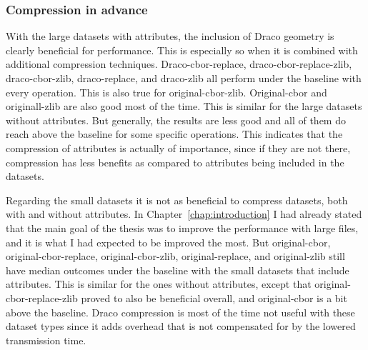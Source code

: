 \subsubsection{Compression in advance}

With the large datasets with attributes, the inclusion of Draco geometry is clearly beneficial for performance.
This is especially so when it is combined with additional compression techniques.
Draco-cbor-replace, draco-cbor-replace-zlib, draco-cbor-zlib, draco-replace, and draco-zlib all perform under the baseline with every operation.
This is also true for original-cbor-zlib. Original-cbor and originall-zlib are also good most of the time.
This is similar for the large datasets without attributes.
But generally, the results are less good and all of them do reach above the baseline for some specific operations.
This indicates that the compression of attributes is actually of importance, since if they are not there, compression has less benefits as compared to attributes being included in the datasets.

Regarding the small datasets it is not as beneficial to compress datasets, both with and without attributes.
In Chapter~\ref{chap:introduction} I had already stated that the main goal of the thesis was to improve the performance with large files, and it is what I had expected to be improved the most.
But original-cbor, original-cbor-replace, original-cbor-zlib, original-replace, and original-zlib still have median outcomes under the baseline with the small datasets that include attributes.
This is similar for the ones without attributes, except that original-cbor-replace-zlib proved to also be beneficial overall, and original-cbor is a bit above the baseline.
Draco compression is most of the time not useful with these dataset types since it adds overhead that is not compensated for by the lowered transmission time.

